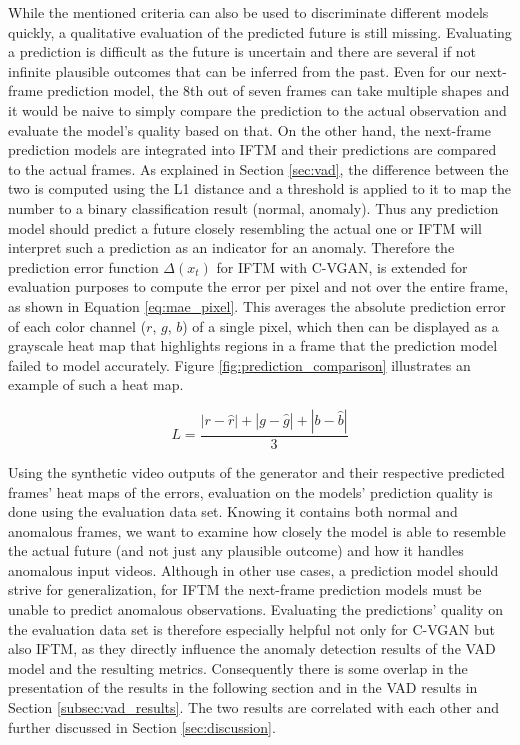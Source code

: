 While the mentioned criteria can also be used to discriminate different models quickly, a qualitative evaluation of the predicted future is still missing. Evaluating a prediction is difficult as the future is uncertain and there are several if not infinite plausible outcomes that can be inferred from the past. Even for our next-frame prediction model, the 8th out of seven frames can take multiple shapes and it would be naive to simply compare the prediction to the actual observation and evaluate the model's quality based on that. On the other hand, the next-frame prediction models are integrated into IFTM and their predictions are compared to the actual frames. As explained in Section \ref{sec:vad}, the difference between the two is computed using the L1 distance and a threshold is applied to it to map the number to a binary classification result (normal, anomaly). Thus any prediction model should predict a future closely resembling the actual one or IFTM will interpret such a prediction as an indicator for an anomaly. Therefore the prediction error function $\Delta(x_{t})$ for IFTM with C-VGAN, is extended for evaluation purposes to compute the error per pixel and not over the entire frame, as shown in Equation \ref{eq:mae_pixel}. This averages the absolute prediction error of each color channel ($r$, $g$, $b$) of a single pixel, which then can be displayed as a grayscale heat map that highlights regions in a frame that the prediction model failed to model accurately. Figure \ref{fig:prediction_comparison} illustrates an example of such a heat map.

\begin{equation} \label{eq:mae_pixel}
L = \frac{| r - \hat{r} | + | g - \hat{g} | + | b - \hat{b} |}{3}
\end{equation}

Using the synthetic video outputs of the generator and their respective predicted frames' heat maps of the errors, evaluation on the models' prediction quality is done using the evaluation data set. Knowing it contains both normal and anomalous frames, we want to examine how closely the model is able to resemble the actual future (and not just any plausible outcome) and how it handles anomalous input videos. Although in other use cases, a prediction model should strive for generalization, for IFTM the next-frame prediction models must be unable to predict anomalous observations. Evaluating the predictions' quality on the evaluation data set is therefore especially helpful not only for C-VGAN but also IFTM, as they directly influence the anomaly detection results of the VAD model and the resulting metrics. Consequently there is some overlap in the presentation of the results in the following section and in the VAD results in Section \ref{subsec:vad_results}. The two results are correlated with each other and further discussed in Section \ref{sec:discussion}.


